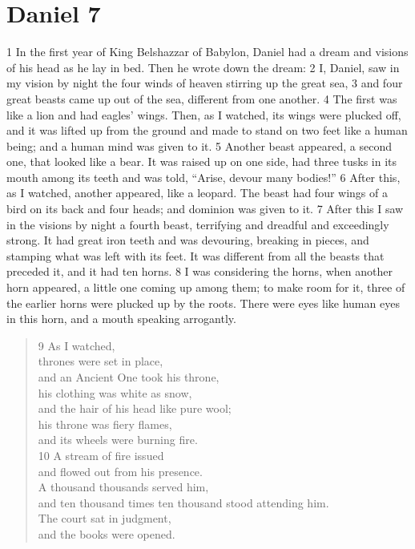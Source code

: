 \chapter{Daniel 7}
\label{ch:daniel7}

1 In the first year of King Belshazzar of Babylon, Daniel had a dream and visions
of his head as he lay in bed. Then he wrote down the dream: 2 I, Daniel, saw in
my vision by night the four winds of heaven stirring up the great sea, 3 and 
four great beasts came up out of the sea, different from one another. 4 The 
first was like a lion and had eagles' wings. Then, as I watched, its wings were
plucked off, and it was lifted up from the ground and made to stand on two feet 
like a human being; and a human mind was given to it. 5 Another beast appeared, 
a second one, that looked like a bear. It was raised up on one side, had three 
tusks in its mouth among its teeth and was told, ``Arise, devour many bodies!'' 
6 After this, as I watched, another appeared, like a leopard. The beast had 
four wings of a bird on its back and four heads; and dominion was given to it.
7 After this I saw in the visions by night a fourth beast, terrifying and 
dreadful and exceedingly strong. It had great iron teeth and was devouring, 
breaking in pieces, and stamping what was left with its feet. It was different
from all the beasts that preceded it, and it had ten horns. 8 I was considering
the horns, when another horn appeared, a little one coming up among them; to 
make room for it, three of the earlier horns were plucked up by the roots. 
There were eyes like human eyes in this horn, and a mouth speaking arrogantly.

\begin{verse}
9 As I watched,\\
thrones were set in place,\\
\hspace{1.5em} and an Ancient One took his throne,\\
his clothing was white as snow,\\
\hspace{1.5em} and the hair of his head like pure wool;\\
his throne was fiery flames,\\
\hspace{1.5em} and its wheels were burning fire.\\
10 A stream of fire issued\\
\hspace{1.5em} and flowed out from his presence.\\
A thousand thousands served him,\\
\hspace{1.5em} and ten thousand times ten thousand stood attending him.\\
The court sat in judgment,\\
\hspace{1.5em} and the books were opened.
\end{verse}

